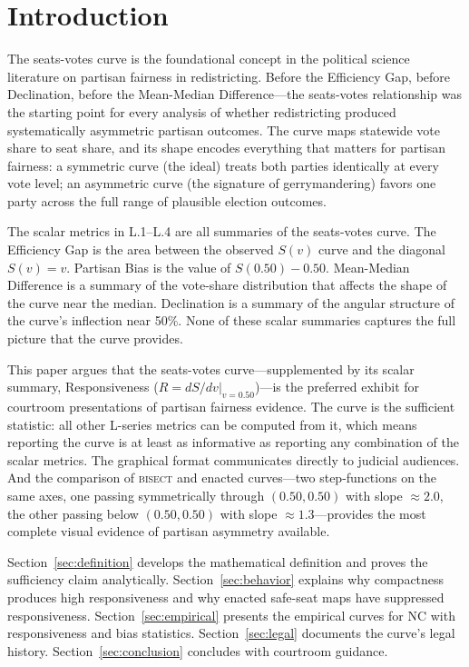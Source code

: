\section{Introduction}
\label{sec:introduction}

The seats-votes curve is the foundational concept in the political science literature
on partisan fairness in redistricting. Before the Efficiency Gap, before Declination,
before the Mean-Median Difference---the seats-votes relationship was the starting
point for every analysis of whether redistricting produced systematically asymmetric
partisan outcomes. The curve maps statewide vote share to seat share, and its shape
encodes everything that matters for partisan fairness: a symmetric curve (the ideal)
treats both parties identically at every vote level; an asymmetric curve (the signature
of gerrymandering) favors one party across the full range of plausible election outcomes.

The scalar metrics in L.1--L.4 are all summaries of the seats-votes curve. The
Efficiency Gap is the area between the observed $S(v)$ curve and the diagonal $S(v) = v$.
Partisan Bias is the value of $S(0.50) - 0.50$. Mean-Median Difference is a summary
of the vote-share distribution that affects the shape of the curve near the median.
Declination is a summary of the angular structure of the curve's inflection near 50\%.
None of these scalar summaries captures the full picture that the curve provides.

This paper argues that the seats-votes curve---supplemented by its scalar summary,
Responsiveness ($R = dS/dv|_{v=0.50}$)---is the preferred exhibit for courtroom
presentations of partisan fairness evidence. The curve is the sufficient statistic:
all other L-series metrics can be computed from it, which means reporting the curve
is at least as informative as reporting any combination of the scalar metrics.
The graphical format communicates directly to judicial audiences. And the comparison
of \textsc{bisect} and enacted curves---two step-functions on the same axes,
one passing symmetrically through $(0.50, 0.50)$ with slope $\approx 2.0$, the
other passing below $(0.50, 0.50)$ with slope $\approx 1.3$---provides the most
complete visual evidence of partisan asymmetry available.

Section~\ref{sec:definition} develops the mathematical definition and proves the
sufficiency claim analytically. Section~\ref{sec:behavior} explains why compactness
produces high responsiveness and why enacted safe-seat maps have suppressed responsiveness.
Section~\ref{sec:empirical} presents the empirical curves for NC with responsiveness
and bias statistics. Section~\ref{sec:legal} documents the curve's legal history.
Section~\ref{sec:conclusion} concludes with courtroom guidance.
